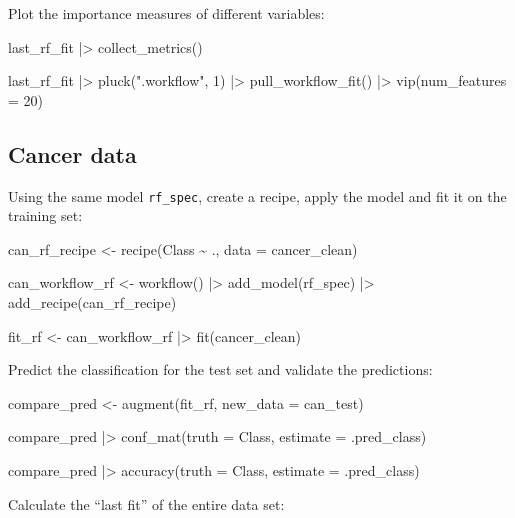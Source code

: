 \documentclass[
  letterpaper,
  DIV=11,
  numbers=noendperiod]{scrreprt}
\newenvironment{Shaded}{\begin{snugshade}}{\end{snugshade}}
\newcommand{\NormalTok}[1]{\textcolor[rgb]{0.00,0.23,0.31}{#1}}
\begin{document}
Plot the importance measures of different variables:

\begin{Shaded}
\begin{Highlighting}[]

\NormalTok{last\_rf\_fit |\textgreater{} }
\NormalTok{  collect\_metrics()}

\NormalTok{last\_rf\_fit |\textgreater{} }
\NormalTok{  pluck(".workflow", 1) |\textgreater{}   }
\NormalTok{  pull\_workflow\_fit() |\textgreater{} }
\NormalTok{  vip(num\_features = 20)}
\end{Highlighting}
\end{Shaded}

\subsection{Cancer data}\label{cancer-data}

Using the same model \texttt{rf\_spec}, create a recipe, apply the model
and fit it on the training set:

\begin{Shaded}
\begin{Highlighting}[]
\NormalTok{can\_rf\_recipe \textless{}{-} }
\NormalTok{  recipe(Class \textasciitilde{} ., data = cancer\_clean) }

\NormalTok{can\_workflow\_rf \textless{}{-} workflow() |\textgreater{}}
\NormalTok{  add\_model(rf\_spec) |\textgreater{}}
\NormalTok{  add\_recipe(can\_rf\_recipe)}

\NormalTok{fit\_rf \textless{}{-} can\_workflow\_rf  |\textgreater{} }
\NormalTok{  fit(cancer\_clean)}
\end{Highlighting}
\end{Shaded}

Predict the classification for the test set and validate the
predictions:

\begin{Shaded}
\begin{Highlighting}[]
\NormalTok{compare\_pred \textless{}{-} augment(fit\_rf, new\_data = can\_test) }

\NormalTok{compare\_pred |\textgreater{} conf\_mat(truth = Class, estimate = .pred\_class)}

\NormalTok{compare\_pred |\textgreater{}  accuracy(truth = Class, estimate = .pred\_class)}
\end{Highlighting}
\end{Shaded}

Calculate the ``last fit'' of the entire data set:
\end{document}
